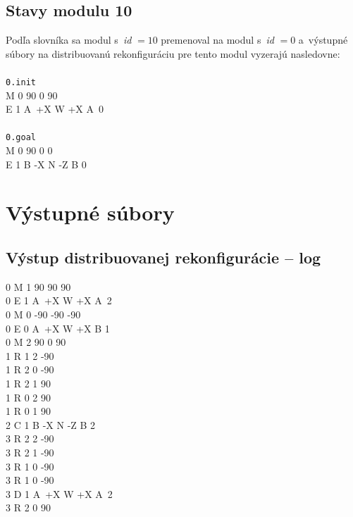 \documentclass[
  printed, %
  oneside, %
  notable,   %
  nolof,     %
  nolot,     %
]{fithesis3}
\begin{document}
\subsection{Stavy modulu 10}
\label{sec:algoInput}
Podľa slovníka sa modul s~\textit{id} $= 10$ premenoval na modul s~\textit{id} $= 0$ a~výstupné súbory na distribuovanú rekonfiguráciu pre tento modul vyzerajú nasledovne: \\ \\
\texttt{0.init} \\
M 0 90 0 90 \\
E 1 A~+X W +X A~0 \\
\\
\texttt{0.goal} \\
M 0 90 0 0 \\
E 1 B -X N -Z B 0 \\

\section{Výstupné súbory}
\subsection{Výstup distribuovanej rekonfigurácie -- log} 
\label{sec:log}
0 M 1 90 90 90 \\
0 E 1 A~+X W +X A~2 \\
0 M 0 -90 -90 -90 \\
0 E 0 A~+X W +X B 1 \\
0 M 2 90 0 90 \\
1 R 1 2 -90 \\
1 R 2 0 -90 \\
1 R 2 1 90 \\
1 R 0 2 90 \\
1 R 0 1 90 \\ 
2 C 1 B -X N -Z B 2 \\
3 R 2 2 -90 \\
3 R 2 1 -90 \\
3 R 1 0 -90 \\
3 R 1 0 -90 \\
3 D 1 A~+X W +X A~2 \\
3 R 2 0 90 
\end{document}
